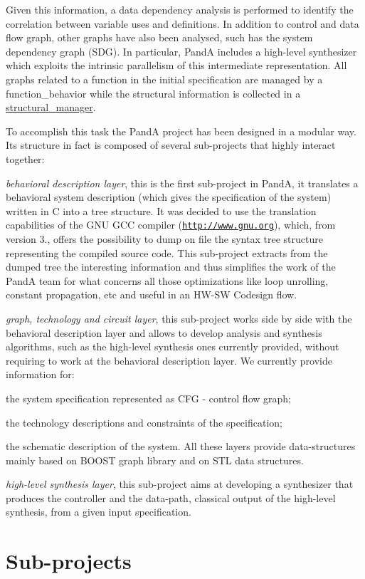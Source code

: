 Given this information, a data dependency analysis is performed to identify the correlation between variable uses and definitions. In addition to control and data flow graph, other graphs have also been analysed, such has the system dependency graph (S\+DG). In particular, PandA includes a high-\/level synthesizer which exploits the intrinsic parallelism of this intermediate representation. All graphs related to a function in the initial specification are managed by a {\ttfamily function\+\_\+behavior} while the structural information is collected in a {\ttfamily \hyperlink{classstructural__manager}{structural\+\_\+manager}}.

To accomplish this task the PandA project has been designed in a modular way. Its structure in fact is composed of several sub-\/projects that highly interact together\+:
\begin{DoxyItemize}
\item {\itshape behavioral description layer}, this is the first sub-\/project in PandA, it translates a behavioral system description (which gives the specification of the system) written in C into a tree structure. It was decided to use the translation capabilities of the G\+NU G\+CC compiler (\href{http://www.gnu.org}{\tt http\+://www.\+gnu.\+org}), which, from version 3., offers the possibility to dump on file the syntax tree structure representing the compiled source code. This sub-\/project extracts from the dumped tree the interesting information and thus simplifies the work of the PandA team for what concerns all those optimizations like loop unrolling, constant propagation, etc and useful in an H\+W-\/\+SW Codesign flow.
\item {\itshape graph, technology and circuit layer}, this sub-\/project works side by side with the behavioral description layer and allows to develop analysis and synthesis algorithms, such as the high-\/level synthesis ones currently provided, without requiring to work at the behavioral description layer. We currently provide information for\+:
\begin{DoxyEnumerate}
\item the system specification represented as C\+FG -\/ control flow graph;
\item the technology descriptions and constraints of the specification;
\item the schematic description of the system. All these layers provide data-\/structures mainly based on B\+O\+O\+ST graph library and on S\+TL data structures.
\end{DoxyEnumerate}
\item {\itshape high-\/level synthesis layer}, this sub-\/project aims at developing a synthesizer that produces the controller and the data-\/path, classical output of the high-\/level synthesis, from a given input specification.
\end{DoxyItemize}\hypertarget{PandA_DOC_subprojects}{}\section{Sub-\/projects}\label{PandA_DOC_subprojects}
